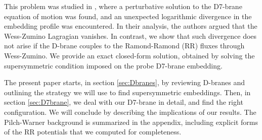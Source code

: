 This problem was studied in \cite{Albash:2011nw}, where a perturbative solution to the D7-brane equation of motion was found, and an unexpected logarithmic divergence in the embedding profile was encountered. In their analysis, the authors argued that the Wess-Zumino Lagragian vanishes. In contrast, we show that such divergence does not arise if the D-brane couples to the Ramond-Ramond (RR) fluxes through Wess-Zumino. We provide an exact closed-form solution, obtained
by solving the supersymmetric condition imposed on the probe D7-brane embedding.


The present paper starts, in section \ref{sec:Dbranes}, by reviewing D-branes and outlining the strategy we will use to find supersymmetric embeddings. Then, in section \ref{sec:D7brane}, we deal with our D7-brane in detail, and find the right configuration. We will conclude by describing the implications of our results. The Pilch-Warner background is summarized in the appendix, including explicit forms of the RR potentials that we computed for completeness. 

